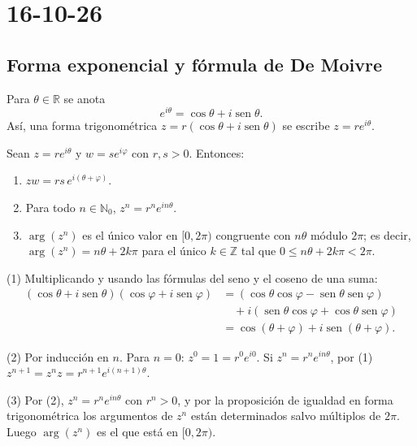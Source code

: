 \chapter{16-10-26}

\section{Forma exponencial y fórmula de De Moivre}

\begin{definicion}
Para $\theta\in\mathbb{R}$ se anota
\[
e^{i\theta}=\cos\theta+i\operatorname{sen}\theta.
\]
Así, una forma trigonométrica $z=r(\cos\theta+i\operatorname{sen}\theta)$ se escribe
$z=re^{i\theta}$.
\end{definicion}

\begin{proposicion}[{title={Producto y fórmula de De Moivre}}]
Sean $z=re^{i\theta}$ y $w=se^{i\varphi}$ con $r,s>0$. Entonces:
\begin{enumerate}
    \item $zw=rs\,e^{i(\theta+\varphi)}$.
    \item Para todo $n\in\mathbb{N}_0$, $z^n=r^n e^{in\theta}$.
    \item $\arg(z^n)$ es el único valor en $[0,2\pi)$ congruente con $n\theta$
    módulo $2\pi$; es decir, $\arg(z^n)=n\theta+2k\pi$ para el único
    $k\in\mathbb{Z}$ tal que $0\le n\theta+2k\pi<2\pi$.
\end{enumerate}
\end{proposicion}

\begin{demostracion}
(1) Multiplicando y usando las fórmulas del seno y el coseno de una suma:
\begin{align*}
(\cos\theta+i\operatorname{sen}\theta)(\cos\varphi+i\operatorname{sen}\varphi)
&=(\cos\theta\cos\varphi-\operatorname{sen}\theta\operatorname{sen}\varphi)\\
&\quad+i(\operatorname{sen}\theta\cos\varphi+\cos\theta\operatorname{sen}\varphi)\\
&=\cos(\theta+\varphi)+i\operatorname{sen}(\theta+\varphi).
\end{align*}

(2) Por inducción en $n$. Para $n=0$: $z^0=1=r^0e^{i0}$. Si $z^n=r^ne^{in\theta}$,
por (1) $z^{n+1}=z^nz=r^{n+1}e^{i(n+1)\theta}$.

(3) Por (2), $z^n=r^ne^{in\theta}$ con $r^n>0$, y por la proposición de igualdad en
forma trigonométrica los argumentos de $z^n$ están determinados salvo múltiplos de
$2\pi$. Luego $\arg(z^n)$ es el que está en $[0,2\pi)$.
\end{demostracion}

